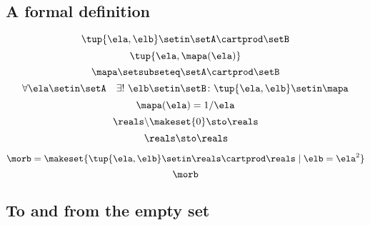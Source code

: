 \begin{forslides}
    \subsection{A formal definition}

    \begin{equation}
        \label{eq:slides_session2_107}
        \tup{\ela, \elb} \setin\setA \cartprod \setB
    \end{equation}
    \begin{equation}
        \label{eq:slides_session2_108}
        \tup{\ela, \mapa(\ela)}
    \end{equation}
    \begin{equation}
        \label{eq:slides_session2_109}
        \mapa \setsubseteq \setA \cartprod \setB
    \end{equation}
    \begin{equation}
        \label{eq:slides_session2_110}
        \forall \ela \setin\setA  \quad  \exists !
        \ \elb \setin\setB \colon \tup{\ela,\elb} \setin\mapa
    \end{equation}
    \begin{equation}
        \label{eq:slides_session2_111}
        \mapa(\ela) = 1/ \ela
    \end{equation}
    \begin{equation}
        \label{eq:slides_session2_112}
        \reals \backslash \makeset{ 0 } \sto \reals
    \end{equation}
    \begin{equation}
        \label{eq:slides_session2_113}
        \reals \sto \reals
    \end{equation}

    \begin{equation}
        \label{eq:slides_session2_113a}
        \morb = \makeset{\tup{\ela, \elb} \setin \reals \cartprod \reals \mid \elb = \ela^2}
    \end{equation}
    \begin{equation}
        \label{eq:slides_session2_113b}
        \morb
    \end{equation}

    \subsection{To and from the empty set}


\end{forslides}
